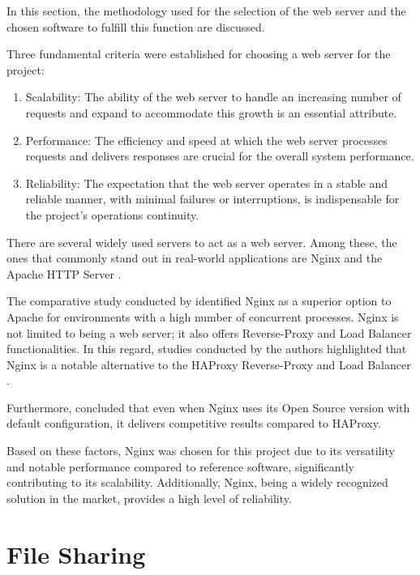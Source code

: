 In this section, the methodology used for the selection of the web server and the chosen software to fulfill this function are discussed.

Three fundamental criteria were established for choosing a web server for the project:

\begin{enumerate}
    \item Scalability: The ability of the web server to handle an increasing number of requests and expand to accommodate this growth is an essential attribute.
    \item Performance: The efficiency and speed at which the web server processes requests and delivers responses are crucial for the overall system performance.
    \item Reliability: The expectation that the web server operates in a stable and reliable manner, with minimal failures or interruptions, is indispensable for the project's operations continuity.
\end{enumerate}

There are several widely used servers to act as a web server. Among these, the ones that commonly stand out in real-world applications are Nginx and the Apache HTTP Server \cite{rob_mccool_apache_2023}.

The comparative study conducted by \textcite{nguyen2017comparative} identified Nginx as a superior option to Apache for environments with a high number of concurrent processes. Nginx is not limited to being a web server; it also offers Reverse-Proxy and Load Balancer functionalities. In this regard, studies conducted by the authors \cite{Chi2012} highlighted that Nginx is a notable alternative to the HAProxy Reverse-Proxy and Load Balancer \cite{willy_tarreau_haproxy_nodate}.

Furthermore, \textcite{Pramono2018} concluded that even when Nginx uses its Open Source version with default configuration, it delivers competitive results compared to HAProxy.

Based on these factors, Nginx was chosen for this project due to its versatility and notable performance compared to reference software, significantly contributing to its scalability. Additionally, Nginx, being a widely recognized solution in the market, provides a high level of reliability.

\section{File Sharing}\label{section:fileSharing}

